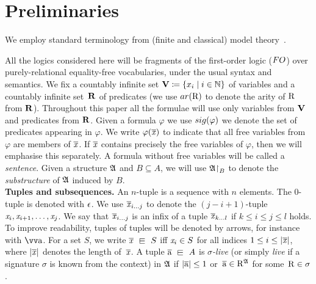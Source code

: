 


\section{Preliminaries}\label{sec:preliminaries}
We employ standard terminology from (finite and classical) model theory~\cite[Sec. 1--3]{Libkin04}.

All the logics considered here will be fragments of the first-order logic ($\FO$) over purely-relational equality-free vocabularies, under the usual syntax and semantics. 
We fix a countably infinite set $\mathbf{V} \coloneqq \{x_i \mid i \in {\mathbb{N}}\}$ of variables and a countably infinite set~$\mathbf{R}$ of predicates (we use $\arity(\relR)$ to denote the arity of $\mathrm{R}$ from $\mathbf{R}$). 
Throughout this paper all the formulae will use only variables from $\mathbf{V}$ and predicates from $\mathbf{R}$.
Given a formula $\varphi$ we use $\sig(\varphi)$ we denote the set of predicates appearing in $\varphi$. 
We write $\varphi(\overline{\mathit{x}})$ to indicate that all free variables from $\varphi$ are members of $\overline{\mathit{x}}$. 
If $\overline{\mathit{x}}$ contains precisely the free
variables of $\varphi$, then we will emphasise this separately.
A formula without free variables will be called a \emph{sentence}.
Given a structure ${\mathfrak{A}}$ and $B \subseteq A$, we will use ${\mathfrak{A}}\mathord{\upharpoonright}_{B}$ to denote the \emph{substructure} of ${\mathfrak{A}}$ induced by $B$.\\

\noindent \textbf{Tuples and subsequences.}
An $n$-tuple is a sequence with $n$ elements. The $0$-tuple is denoted with $\epsilon$.
We use $\overline{\mathit{x}}_{i\ldots j}$ to denote the $(j{-}i{+}1)$-tuple $\mathit{x}_i, \mathit{x}_{i+1}, \ldots, \mathit{x}_j$.
We say that $\overline{\mathit{x}}_{i\ldots j}$ is an infix of a tuple $\overline{\mathit{x}}_{k\ldots l}$ if $k \leq i \leq j \leq l$ holds. 
To improve readability, tuples of tuples will be denoted by arrows, for instance with $\elemtuptuplea$.
For a set $S$, we write $\vartuplex \sqin S$ iff $\mathit{x}_i \in S$ for all indices $1 \leq i \leq |\overline{\mathit{x}}|$, where $|\overline{\mathit{x}}|$ denotes the length of~$\overline{\mathit{x}}$. 
A tuple $\elemtuplea \sqin A$ is \emph{$\sigma$-live} (or simply \emph{live} if a signature $\sigma$ is known from the context) in ${\mathfrak{A}}$ if $|\overline{\mathrm{a}}| \leq 1$ or~$\overline{\mathrm{a}} \in \mathrm{R}^{{\mathfrak{A}}}$ for some~$\mathrm{R} \in \sigma$.\\

